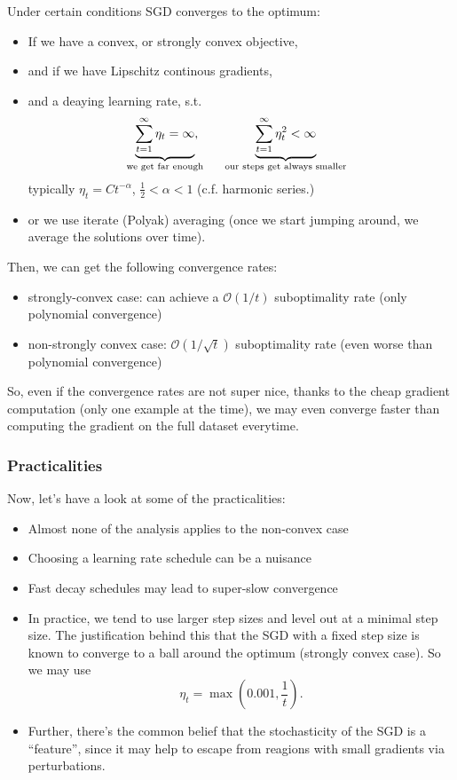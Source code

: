 \documentclass[a2paper,8pt]{extarticle}
\newcommand{\BigO}{\mathcal{O}}
\begin{document}
\begin{landscape}
\begin{multicols*}{7}
Under certain conditions SGD converges to the optimum:
\begin{itemize}
  \item If we have a convex, or strongly convex objective,
  \item and if we have Lipschitz continous gradients,
  \item and a deaying learning rate, s.t.
  \[
  \underbrace{\sum_{t=1}^\infty\eta_t=\infty}_{\mathclap{\text{we get far
  enough}}},
  \qquad
  \underbrace{\sum_{t=1}^\infty\eta_t^2<\infty}_{\text{our steps get always
  smaller}}
  \]
  typically $\eta_t=Ct^{-\alpha}$, $\frac{1}{2}<\alpha<1$ (c.f. harmonic
  series.)
  \item or we use iterate (Polyak) averaging (once we start jumping around, we
  average the solutions over time).
\end{itemize}
Then, we can get the following convergence rates:
\begin{itemize}
  \item strongly-convex case: can achieve a $\BigO(1/t)$ suboptimality rate
  (only polynomial convergence)
  \item non-strongly convex case: $\BigO(1/\sqrt{t})$ suboptimality rate (even
  worse than polynomial convergence)
\end{itemize}
So, even if the convergence rates are not super nice, thanks to the cheap
gradient computation (only one example at the time), we may even converge faster
than computing the gradient on the full dataset everytime.

\subsubsection{Practicalities}

Now, let's have a look at some of the practicalities:
\begin{itemize}
  \item Almost none of the analysis applies to the non-convex case
  \item Choosing a learning rate schedule can be a nuisance
  \item Fast decay schedules may lead to super-slow convergence
  \item In practice, we tend to use larger step sizes and level out at a minimal
  step size. The justification behind this that the SGD with a fixed step size
  is known to converge to a ball around the optimum (strongly convex case). So
  we may use
  \[
  \eta_t=\max(0.001,\frac{1}{t}).
  \]
  \item Further, there's the common belief that the stochasticity of the SGD is
  a ``feature'', since it may help to escape from reagions with small gradients
  via perturbations.
\end{itemize}


\end{multicols*}
\end{landscape}
\end{document}
